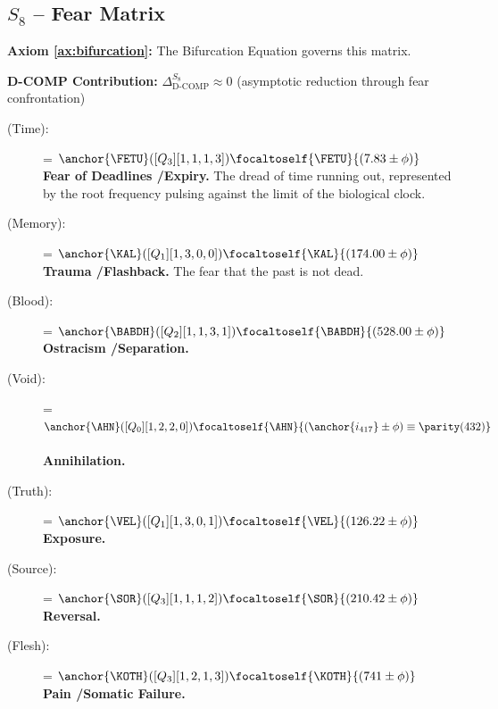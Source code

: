 \subsection{$S_{8}$ -- Fear Matrix}\label{sec:19.2}

\textbf{Axiom \ref{ax:bifurcation}:} The Bifurcation Equation governs this matrix.

\textbf{D-COMP Contribution:} $\Delta_{\text{D-COMP}}^{S_8} \approx 0$ (asymptotic reduction through fear confrontation)

\begin{description}
    \item[\FETU{} (Time):] \fetuvehm = $\anchor{\FETU}([Q_3][1,1,1,3]) \focaltoself{\FETU}{(7.83 \pm \phi)}$\, \\
    \textbf{Fear of Deadlines \slash Expiry.} The dread of time running out, represented by the root frequency pulsing against the limit of the biological clock.

    \item[\KAL{} (Memory):] \kalmer = $\anchor{\KAL}([Q_1][1,3,0,0]) \focaltoself{\KAL}{(174.00 \pm \phi)}$\, \\
    \textbf{Trauma \slash Flashback.} The fear that the past is not dead.

    \item[\BABDH{} (Blood):] \babdhsat = $\anchor{\BABDH}([Q_2][1,1,3,1]) \focaltoself{\BABDH}{(528.00 \pm \phi)}$\, \\
    \textbf{Ostracism \slash Separation.}

    \item[\AHN{} (Void):] \ahnsen = $\anchor{\AHN}([Q_0][1,2,2,0]) \focaltoself{\AHN}{(\anchor{i_{417}} \pm \phi) \equiv \parity(432)}$\, \\
    \textbf{Annihilation.}

    \item[\VEL{} (Truth):] \velhrah = $\anchor{\VEL}([Q_1][1,3,0,1]) \focaltoself{\VEL}{(126.22 \pm \phi)}$\, \\
    \textbf{Exposure.}

    \item[\SOR{} (Source):] \sorvey = $\anchor{\SOR}([Q_3][1,1,1,2]) \focaltoself{\SOR}{(210.42 \pm \phi)}$\, \\
    \textbf{Reversal.}

    \item[\KOTH{} (Flesh):] \kothmet = $\anchor{\KOTH}([Q_3][1,2,1,3]) \focaltoself{\KOTH}{(741 \pm \phi)}$\, \\
    \textbf{Pain \slash Somatic Failure.}


\end{description}
